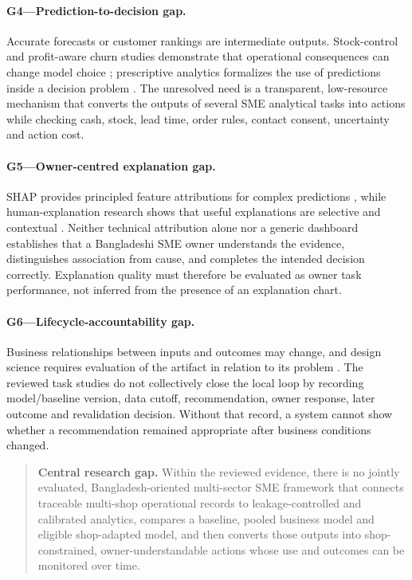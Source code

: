 \paragraph{G4---Prediction-to-decision gap.}
Accurate forecasts or customer rankings are intermediate outputs. Stock-control
and profit-aware churn studies demonstrate that operational consequences can
change model choice \cite{syntetos2010stock}; prescriptive
analytics formalizes the use of predictions inside a decision problem
\cite{bertsimas2020prescriptive}. The unresolved need is a transparent,
low-resource mechanism that converts the outputs of several SME analytical
tasks into actions while checking cash, stock, lead time, order rules, contact
consent, uncertainty and action cost.

\paragraph{G5---Owner-centred explanation gap.}
SHAP provides principled feature attributions for complex predictions
\cite{lundberg2017shap}, while human-explanation research shows
that useful explanations are selective and contextual
\cite{miller2019explanation}. Neither technical attribution alone nor a generic
dashboard establishes that a Bangladeshi SME owner understands the evidence,
distinguishes association from cause, and completes the intended decision
correctly. Explanation quality must therefore be evaluated as owner task
performance, not inferred from the presence of an explanation chart.

\paragraph{G6---Lifecycle-accountability gap.}
Business relationships between inputs and outcomes may change, and design
science requires evaluation of the artifact in relation to its problem
\cite{hevner2004design}. The reviewed task
studies do not collectively close the local loop by recording model/baseline
version, data cutoff, recommendation, owner response, later outcome and
revalidation decision. Without that record, a system cannot show whether a
recommendation remained appropriate after business conditions changed.

\begin{quote}
\textbf{Central research gap.} Within the reviewed evidence, there is no jointly
evaluated, Bangladesh-oriented multi-sector SME framework that connects
traceable multi-shop operational records to leakage-controlled and calibrated
analytics, compares a baseline, pooled business model and eligible shop-adapted
model, and then converts those outputs into shop-constrained,
owner-understandable actions whose use and outcomes can be monitored over time.
\end{quote}

